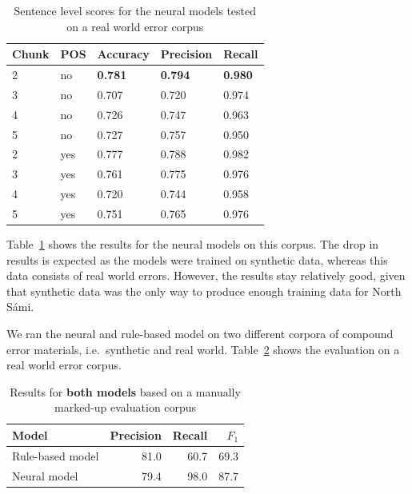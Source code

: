 \documentclass[postprint]{flammie}
\begin{document}
\begin{table}[htb]
\centering
\begin{tabular}{lllll}
\toprule
\textbf{Chunk} & \textbf{POS} & \textbf{Accuracy}   & \textbf{Precision}  &
    \textbf{Recall} \\ \midrule
2     & no  & \textbf{0.781} & \textbf{0.794} & \textbf{0.980}  \\
3     & no  & 0.707 & 0.720 & 0.974  \\
4     & no  & 0.726 & 0.747 & 0.963  \\
5     & no  & 0.727 & 0.757 & 0.950  \\
2     & yes & 0.777 & 0.788 & 0.982  \\
3     & yes & 0.761 & 0.775 & 0.976  \\
4     & yes & 0.720 & 0.744 & 0.958  \\
5     & yes & 0.751 & 0.765 & 0.976  \\
    \bottomrule
\end{tabular}
\caption{Sentence level scores for the neural models tested on a real world
    error corpus\label{tab:neural-real-world-res}}
\end{table}

Table~\ref{tab:neural-real-world-res} shows the results for the neural models on
this corpus. The drop in results is expected as the models were trained on
synthetic data, whereas this data consists of real world errors. However, the
results stay relatively good, given that synthetic data was the only way to
produce enough training data for North Sámi.

We ran the neural and rule-based model on two different corpora of compound
error materials, i.e.\ synthetic and real world.  Table~\ref{tab:my_label} shows
the evaluation on a real world error corpus.

\begin{table}[htb]
    \centering
    \begin{tabular}{lrrr}
    \toprule
        \bf Model & \bf Precision & \bf Recall & \bf $F_1$ \\
        \midrule
        Rule-based model & 81.0 & 60.7 & 69.3 \\
        Neural model & 79.4 & 98.0 & 87.7 \\
        \bottomrule
    \end{tabular}
    \caption{Results for \textbf{both models} based on a manually marked-up
    evaluation corpus\label{tab:my_label}}
\end{table}
\end{document}
